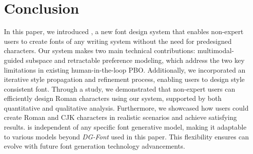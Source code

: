 \section{Conclusion}
In this paper, we introduced \systemName, a new font design system that enables non-expert users to create fonts of any writing system without the need for predesigned characters.
Our system makes two main technical contributions: multimodal-guided subspace and retractable preference modeling, which address the two key limitations in existing human-in-the-loop PBO.
Additionally, we incorporated an iterative style propagation and refinement process, enabling users to design style consistent font.
Through a study, we demonstrated that non-expert users can efficiently design Roman characters using our system, supported by both quantitative and qualitative analysis.
Furthermore, we showcased how users could create Roman and CJK characters in realistic scenarios and achieve satisfying results.
\systemName is independent of any specific font generative model, making it adaptable to various models beyond \textit{DG-Font} used in this paper.
This flexibility ensures \systemName can evolve with future font generation technology advancements.
